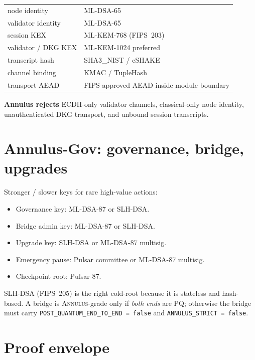 \documentclass[11pt,a4paper]{article}
\newcommand{\Annulus}{\textsc{Annulus}}
\newcommand{\PQ}{\textsf{PQ}}
\begin{document}
\begin{center}\small
\begin{tabular}{l l}
\toprule
node identity & ML-DSA-65 \\
validator identity & ML-DSA-65 \\
session KEX & ML-KEM-768 (FIPS~203) \\
validator / DKG KEX & ML-KEM-1024 preferred \\
transcript hash & SHA3\_NIST / cSHAKE \\
channel binding & KMAC / TupleHash \\
transport AEAD & FIPS-approved AEAD inside module boundary \\
\bottomrule
\end{tabular}
\end{center}

\textbf{Annulus rejects} ECDH-only validator channels,
classical-only node identity, unauthenticated DKG transport, and
unbound session transcripts.

\section{Annulus-Gov: governance, bridge, upgrades}
\label{sec:annulus-gov}

Stronger / slower keys for rare high-value actions:

\begin{itemize}[leftmargin=*, itemsep=0pt]
\item Governance key: ML-DSA-87 or SLH-DSA.
\item Bridge admin key: ML-DSA-87 or SLH-DSA.
\item Upgrade key: SLH-DSA or ML-DSA-87 multisig.
\item Emergency pause: Pulsar committee or ML-DSA-87 multisig.
\item Checkpoint root: Pulsar-87.
\end{itemize}

\noindent
SLH-DSA (FIPS~205) is the right cold-root because it is stateless
and hash-based. A bridge is \Annulus{}-grade only if \emph{both
ends} are \PQ{}; otherwise the bridge must carry
\texttt{POST\_QUANTUM\_END\_TO\_END = false} and
\texttt{ANNULUS\_STRICT = false}.

\section{Proof envelope}
\label{sec:proof-envelope}
\end{document}
